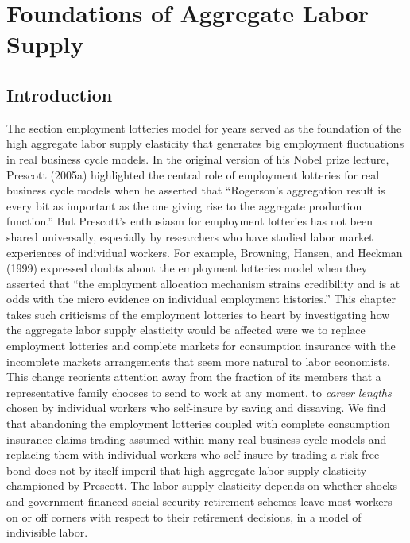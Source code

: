 
%


%
%
\def\lege{\raise.3ex\hbox{$>$\kern-.75em\lower1ex\hbox{$<$}}}

\chapter{Foundations of Aggregate Labor Supply\label{macrolaborII}}


\section{Introduction}

The  section  employment lotteries model   for years %
served as the foundation of the high aggregate labor supply
elasticity  that  generates big employment fluctuations   in   real business cycle models.
  In the original version of his Nobel prize lecture, Prescott (2005a) highlighted the central role of employment
lotteries  for real business cycle models when he asserted
that ``Rogerson's aggregation result is every bit as important as
the one giving rise to the aggregate production function.''
But Prescott's enthusiasm for employment lotteries has  not been shared universally, especially by
researchers who have studied labor market experiences of individual workers.  For example,
Browning, Hansen, and Heckman (1999)  expressed  doubts about the employment lotteries model
when they asserted  that ``the employment allocation
mechanism strains credibility and is at odds with the micro
evidence on individual employment histories.'' This chapter takes such criticisms of the employment lotteries
 to heart by
investigating how  the aggregate labor supply elasticity would be affected
were we to replace employment lotteries and complete markets for consumption insurance
with the incomplete markets arrangements that seem  more natural  to labor economists. This change reorients attention away from
the fraction of its members that a representative family chooses to send to work at any moment, to  {\it career lengths} chosen by individual workers who self-insure
by saving and dissaving.  We find that abandoning the employment lotteries coupled with
complete consumption insurance claims trading assumed within many real business cycle models and replacing them with individual workers who self-insure by trading
a risk-free bond does not by itself imperil that high aggregate labor supply elasticity championed by Prescott.  The labor supply elasticity
depends on whether shocks and
 government financed social security retirement schemes leave most workers on or off corners with respect to their retirement
decisions, in a model of indivisible labor.
%

